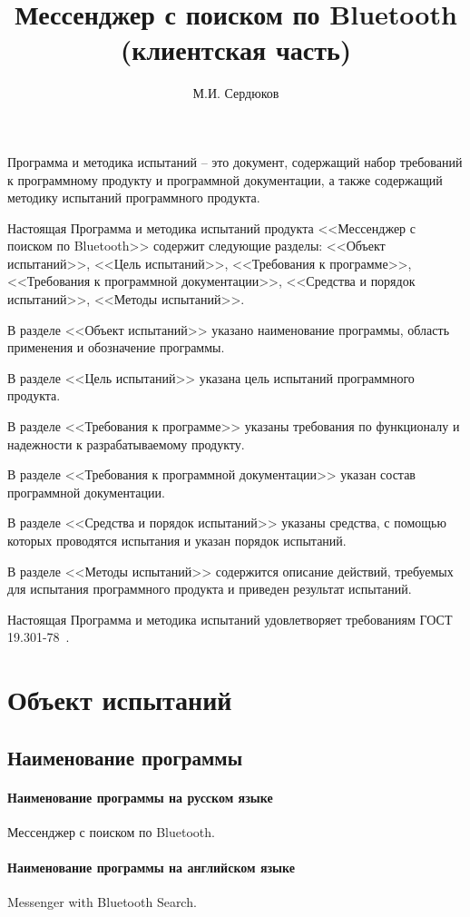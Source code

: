 \documentclass[testmethods]{espd}
\author{М.И. Сердюков}
\title{Мессенджер с поиском по Bluetooth\\(клиентская часть)}
\begin{document}
\annotation

Программа и методика испытаний -- это документ, содержащий набор требований к программному продукту и программной документации, а также содержащий методику испытаний программного продукта.

Настоящая Программа и методика испытаний продукта <<Мессенджер с поиском по Bluetooth>> содержит следующие разделы: <<Объект испытаний>>, <<Цель испытаний>>, <<Требования к программе>>, <<Требования к программной документации>>, <<Средства и порядок испытаний>>, <<Методы испытаний>>.

В разделе <<Объект испытаний>> указано наименование программы, область применения и обозначение программы.

В разделе <<Цель испытаний>> указана цель испытаний программного продукта.

В разделе <<Требования к программе>> указаны требования по функционалу и надежности к разрабатываемому продукту.

В разделе <<Требования к программной документации>> указан состав программной документации.

В разделе <<Средства и порядок испытаний>> указаны средства, с помощью которых проводятся испытания и указан порядок испытаний.

В разделе <<Методы испытаний>> содержится описание действий, требуемых для испытания программного продукта и приведен результат испытаний.

Настоящая Программа и методика испытаний удовлетворяет требованиям ГОСТ 19.301-78~\cite{espd301}.

\tableofcontents

\section{Объект испытаний}
\subsection{Наименование программы}
\paragraph{Наименование программы на русском языке}
Мессенджер с поиском по Bluetooth.
\paragraph{Наименование программы на английском языке}
Messenger with Bluetooth Search.
\end{document}

